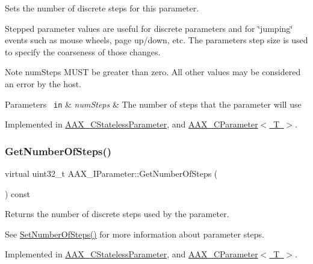 Sets the number of discrete steps for this parameter. 

Stepped parameter values are useful for discrete parameters and for \char`\"{}jumping\char`\"{} events such as mouse wheels, page up/down, etc. The parameter\textquotesingle{}s step size is used to specify the coarseness of those changes.

\begin{DoxyNote}{Note}
num\+Steps M\+U\+ST be greater than zero. All other values may be considered an error by the host.
\end{DoxyNote}

\begin{DoxyParams}[1]{Parameters}
\mbox{\texttt{ in}}  & {\em num\+Steps} & The number of steps that the parameter will use \\
\hline
\end{DoxyParams}


Implemented in \mbox{\hyperlink{a01541_a5bf5527cf5ef918923dd21f4ebee6179}{A\+A\+X\+\_\+\+C\+Stateless\+Parameter}}, and \mbox{\hyperlink{a01537_ac1c0ee92affe0379a58411955d27bb2b}{A\+A\+X\+\_\+\+C\+Parameter$<$ T $>$}}.

\mbox{\label{a01857_af2a4893e048666aca929846e7b5634cd}} 
\subsubsection{\texorpdfstring{GetNumberOfSteps()}{GetNumberOfSteps()}}
{\footnotesize\ttfamily virtual uint32\+\_\+t A\+A\+X\+\_\+\+I\+Parameter\+::\+Get\+Number\+Of\+Steps (\begin{DoxyParamCaption}{ }\end{DoxyParamCaption}) const\hspace{0.3cm}{\ttfamily [pure virtual]}}



Returns the number of discrete steps used by the parameter. 

See \mbox{\hyperlink{a01857_ac81903d0388a03045a57dd4c455b6f02}{Set\+Number\+Of\+Steps()}} for more information about parameter steps. 

Implemented in \mbox{\hyperlink{a01541_af45ddd2fc08c33ce5635f0e01ea1e814}{A\+A\+X\+\_\+\+C\+Stateless\+Parameter}}, and \mbox{\hyperlink{a01537_afe660c842ca2bc05acb249def909e5e9}{A\+A\+X\+\_\+\+C\+Parameter$<$ T $>$}}.

